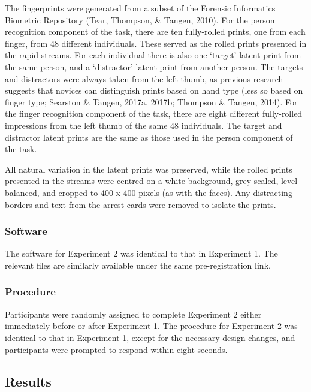 \documentclass[
  english,
  man]{apa6}
\begin{document}
The fingerprints were generated from a subset of the Forensic Informatics Biometric Repository (Tear, Thompson, \& Tangen, 2010). For the person recognition component of the task, there are ten fully-rolled prints, one from each finger, from 48 different individuals. These served as the rolled prints presented in the rapid streams. For each individual there is also one `target' latent print from the same person, and a `distractor' latent print from another person. The targets and distractors were always taken from the left thumb, as previous research suggests that novices can distinguish prints based on hand type (less so based on finger type; Searston \& Tangen, 2017a, 2017b; Thompson \& Tangen, 2014). For the finger recognition component of the task, there are eight different fully-rolled impressions from the left thumb of the same 48 individuals. The target and distractor latent prints are the same as those used in the person component of the task.

All natural variation in the latent prints was preserved, while the rolled prints presented in the streams were centred on a white background, grey-scaled, level balanced, and cropped to 400 x 400 pixels (as with the faces). Any distracting borders and text from the arrest cards were removed to isolate the prints.

\hypertarget{software-1}{%
\subsubsection{Software}\label{software-1}}

The software for Experiment 2 was identical to that in Experiment 1. The relevant files are similarly available under the same pre-registration link.

\hypertarget{procedure-1}{%
\subsubsection{Procedure}\label{procedure-1}}

Participants were randomly assigned to complete Experiment 2 either immediately before or after Experiment 1. The procedure for Experiment 2 was identical to that in Experiment 1, except for the necessary design changes, and participants were prompted to respond within eight seconds.

\hypertarget{results-1}{%
\subsection{Results}\label{results-1}}
\end{document}

